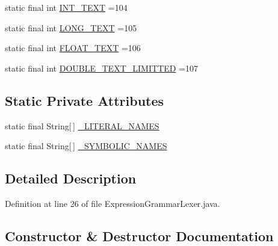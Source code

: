 \begin{DoxyCompactItemize}
static final int \hyperlink{classgov_1_1nasa_1_1jpf_1_1inspector_1_1server_1_1expression_1_1parser_1_1_expression_grammar_lexer_a673063bb386188218c3cb2aba53c2a67}{I\+N\+T\+\_\+\+T\+E\+XT} =104
\item 
static final int \hyperlink{classgov_1_1nasa_1_1jpf_1_1inspector_1_1server_1_1expression_1_1parser_1_1_expression_grammar_lexer_a295b5f590bb59aa98eaaf377adb7a26f}{L\+O\+N\+G\+\_\+\+T\+E\+XT} =105
\item 
static final int \hyperlink{classgov_1_1nasa_1_1jpf_1_1inspector_1_1server_1_1expression_1_1parser_1_1_expression_grammar_lexer_a4a8e6b85981bb4e4b7a1e5fbd0c09915}{F\+L\+O\+A\+T\+\_\+\+T\+E\+XT} =106
\item 
static final int \hyperlink{classgov_1_1nasa_1_1jpf_1_1inspector_1_1server_1_1expression_1_1parser_1_1_expression_grammar_lexer_a52cfff9af4b9b6a2a998972d72674216}{D\+O\+U\+B\+L\+E\+\_\+\+T\+E\+X\+T\+\_\+\+L\+I\+M\+I\+T\+T\+ED} =107
\end{DoxyCompactItemize}
\subsection*{Static Private Attributes}
\begin{DoxyCompactItemize}
\item 
static final String\mbox{[}$\,$\mbox{]} \hyperlink{classgov_1_1nasa_1_1jpf_1_1inspector_1_1server_1_1expression_1_1parser_1_1_expression_grammar_lexer_a48bbb62b6d539fe539cab97c828b27e6}{\+\_\+\+L\+I\+T\+E\+R\+A\+L\+\_\+\+N\+A\+M\+ES}
\item 
static final String\mbox{[}$\,$\mbox{]} \hyperlink{classgov_1_1nasa_1_1jpf_1_1inspector_1_1server_1_1expression_1_1parser_1_1_expression_grammar_lexer_ae981a3758a3e07d16031e52e5b7356ec}{\+\_\+\+S\+Y\+M\+B\+O\+L\+I\+C\+\_\+\+N\+A\+M\+ES}
\end{DoxyCompactItemize}


\subsection{Detailed Description}


Definition at line 26 of file Expression\+Grammar\+Lexer.\+java.



\subsection{Constructor \& Destructor Documentation}

